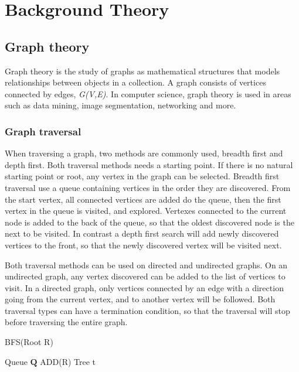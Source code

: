 \chapter{Background Theory}
\label{cha:background_theory}
\section{Graph theory}
Graph theory is the study of graphs as mathematical structures that models relationships between objects in a collection. A graph consists of vertices connected by edges, \emph{G(V,E)}. In computer science, graph theory is used in areas such as data mining, image segmentation, networking and more\cite{riaz2011applications}. 

\subsection{Graph traversal}
When traversing a graph, two methods are commonly used, breadth first and depth first. Both traversal methods needs a starting point. If there is no natural starting point or root, any vertex in the graph can be selected. Breadth first traversal use a queue containing vertices in the order they are discovered. From the start vertex, all connected vertices are added do the queue, then the first vertex in the queue is visited, and explored. Vertexes connected to the current node is added to the back of the queue, so that the oldest discovered node is the next to be visited. In contrast a depth first search will add newly discovered vertices to the front, so that the newly discovered vertex will be visited next.

Both traversal methods can be used on directed and undirected graphs. On an undirected graph, any vertex discovered can be added to the list of vertices to visit. In a directed graph, only vertices connected by an edge with a direction going from the current vertex, and to another vertex will be followed. Both traversal types can have a termination condition, so that the traversal will stop before traversing the entire graph. 

\begin{algorithm}[H]
    \caption{BFS(Root R)}
    \label{BFS}
    \SetAlgoLined
    Queue $\mathbf{Q}$ ADD(R)\; Tree t \;
\end{algorithm}

